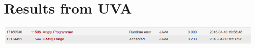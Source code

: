 \documentclass[12pt]{article}
\begin{document}

\newcommand{\hmwkClass}{COS 255}
\newcommand{\hmwkSemester}{Spring 2016}

\newcommand{\hmwkAuthorName}{Lukas Leung}
\newcommand{\hmwkAuthorID}{lleung}

\newcommand{\hmwkAssignmentNum}{6}

\newcommand{\hmwkProblemNum}{1}

\newcommand{\hmwkCollaborators}{}
\thispagestyle{fancycollab}

\section{Results from UVA}
\includegraphics[width=\textwidth]{results}

\end{document}
